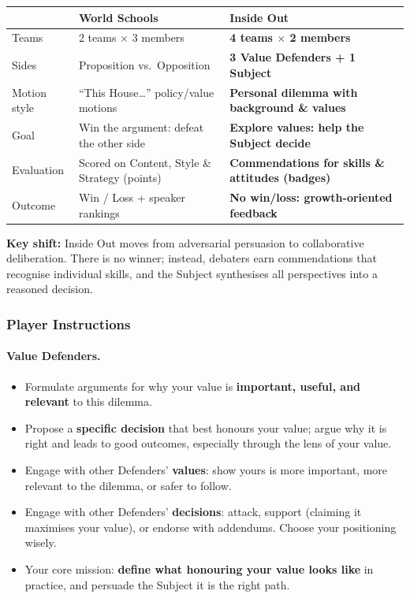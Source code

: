 \begin{center}
\begin{tabular}{|l|p{5cm}|p{5cm}|}
\hline
\textbf{} & \textbf{World Schools} & \textbf{Inside Out} \\
\hline
Teams & 2 teams $\times$ 3 members & \textbf{4 teams $\times$ 2 members} \\
\hline
Sides & Proposition vs.\ Opposition & \textbf{3 Value Defenders + 1 Subject} \\
\hline
Motion style & ``This House\ldots'' policy/value motions & \textbf{Personal dilemma with background \& values} \\
\hline
Goal & Win the argument: defeat the other side & \textbf{Explore values: help the Subject decide} \\
\hline
Evaluation & Scored on Content, Style \& Strategy (points) & \textbf{Commendations for skills \& attitudes (badges)} \\
\hline
Outcome & Win / Loss + speaker rankings & \textbf{No win/loss: growth-oriented feedback} \\
\hline
\end{tabular}
\end{center}

\medskip

\noindent\textbf{Key shift:} Inside Out moves from adversarial persuasion to collaborative deliberation. There is no winner; instead, debaters earn commendations that recognise individual skills, and the Subject synthesises all perspectives into a reasoned decision.

\subsubsection{Player Instructions}

\paragraph{Value Defenders.}
\begin{itemize}
    \item Formulate arguments for why your value is \textbf{important, useful, and relevant} to this dilemma.
    \item Propose a \textbf{specific decision} that best honours your value; argue why it is right and leads to good outcomes, especially through the lens of your value.
    \item Engage with other Defenders' \textbf{values}: show yours is more important, more relevant to the dilemma, or safer to follow.
    \item Engage with other Defenders' \textbf{decisions}: attack, support (claiming it maximises your value), or endorse with addendums. Choose your positioning wisely.
    \item Your core mission: \textbf{define what honouring your value looks like} in practice, and persuade the Subject it is the right path.
\end{itemize}

